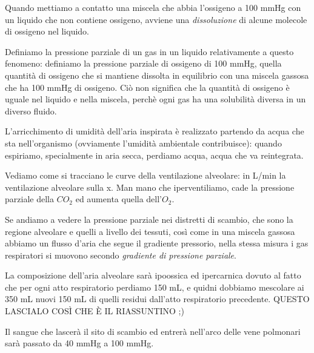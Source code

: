 \documentclass[a4paper,12pt]{article}
\begin{document}
Quando mettiamo a contatto una miscela che abbia l'ossigeno a 100 mmHg con un liquido che non contiene ossigeno, avviene una \emph{dissoluzione} di alcune molecole di ossigeno nel liquido.

Definiamo la pressione parziale di un gas in un liquido relativamente a questo fenomeno: definiamo la pressione parziale di ossigeno di 100 mmHg, quella quantità di ossigeno che si mantiene dissolta in equilibrio con una miscela gassosa che ha 100 mmHg di ossigeno. Ciò non significa che la quantità di ossigeno è uguale nel liquido e nella miscela, perchè ogni gas ha una solubilità diversa in un diverso  fluido.

L'arricchimento di umidità dell'aria inspirata è realizzato partendo da acqua che sta nell'organismo (ovviamente l'umidità ambientale contribuisce): quando espiriamo, specialmente in aria secca, perdiamo acqua, acqua che va reintegrata. 

Vediamo come si tracciano le curve della ventilazione alveolare: in L/min la ventilazione alveolare sulla x. Man mano che iperventiliamo, cade la pressione parziale della $CO_{2}$ ed aumenta quella dell'$O_{2}$.

Se andiamo a vedere la pressione parziale nei distretti di scambio, che sono la regione alveolare e quelli a livello dei tessuti, così come in una miscela gassosa abbiamo un flusso d'aria che segue il gradiente pressorio, nella stessa misura i gas respiratori si muovono secondo \emph{gradiente di pressione parziale}.

La composizione dell'aria alveolare sarà ipoossica ed ipercarnica dovuto al fatto che per ogni atto respiratorio perdiamo 150 mL, e quidni dobbiamo mescolare ai 350 mL nuovi 150 mL di quelli residui dall'atto respiratorio precedente. QUESTO LASCIALO COSÌ CHE È IL RIASSUNTINO ;)

Il sangue che lascerà il sito di scambio ed entrerà nell'arco delle vene polmonari sarà passato da 40 mmHg a 100 mmHg. 
 
 
 
 
 
 
\end{document}
